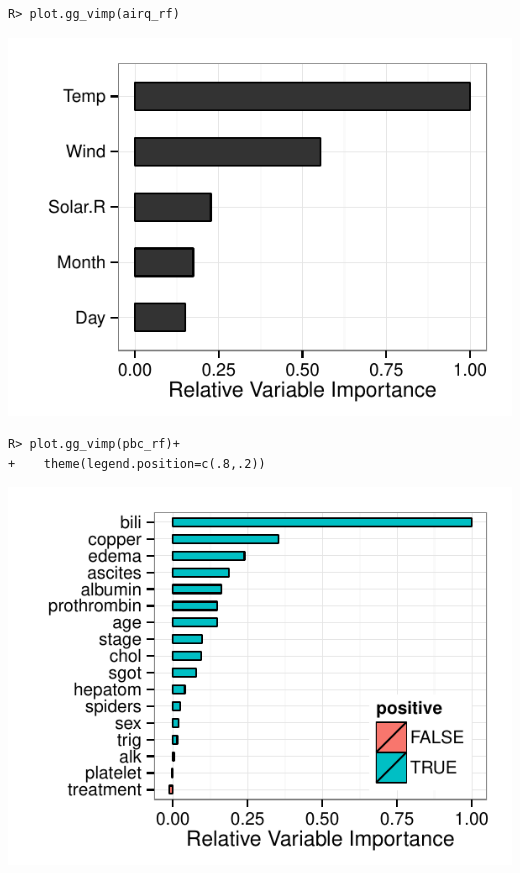\documentclass[nojss,letterpaper]{jss}\usepackage[]{graphicx}\usepackage[]{color}
\makeatletter
\def\maxwidth{ %
  \ifdim\Gin@nat@width>\linewidth
    \linewidth
  \else
    \Gin@nat@width
  \fi
}
\newenvironment{kframe}{%
 \def\at@end@of@kframe{}%
 \ifinner\ifhmode%
  \def\at@end@of@kframe{\end{minipage}}%
  \begin{minipage}{\columnwidth}%
 \fi\fi%
 \def\FrameCommand##1{\hskip\@totalleftmargin \hskip-\fboxsep
 \colorbox{shadecolor}{##1}\hskip-\fboxsep
     \hskip-\linewidth \hskip-\@totalleftmargin \hskip\columnwidth}%
 \MakeFramed {\advance\hsize-\width
   \@totalleftmargin\z@ \linewidth\hsize
   \@setminipage}}%
 {\par\unskip\endMakeFramed%
 \at@end@of@kframe}
\newenvironment{knitrout}{}{} %
\makeatother
\begin{document}
\begin{knitrout}\footnotesize
{}\color{fgcolor}\begin{kframe}
\begin{verbatim}
R> plot.gg_vimp(airq_rf)
\end{verbatim}
\end{kframe}

{\centering \includegraphics[width=\maxwidth]{figure/vig-airq-vimp-1} 

}



\end{knitrout}

\begin{knitrout}\footnotesize
{}\color{fgcolor}\begin{kframe}
\begin{verbatim}
R> plot.gg_vimp(pbc_rf)+
+    theme(legend.position=c(.8,.2))
\end{verbatim}
\end{kframe}

{\centering \includegraphics[width=\maxwidth]{figure/vig-pbc-vimp-1} 

}



\end{knitrout}
\end{document}

